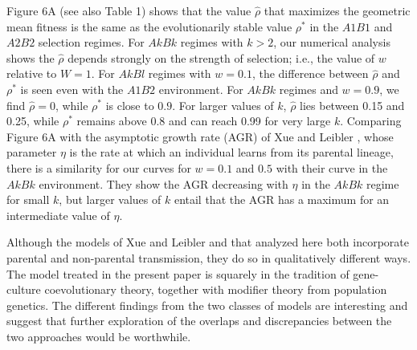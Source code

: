 \documentclass[9pt,twocolumn,twoside,lineno]{pnas-new}
\begin{document}
 Figure 6A (see also Table 1) shows that the value $\hat\rho$ that maximizes the geometric mean fitness is the same as the evolutionarily stable value $\rho^*$ in the $A1B1$ and $A2B2$ selection regimes. For $AkBk$ regimes with $k>2$, our numerical analysis shows the $\hat\rho$ depends strongly on the strength of selection; i.e., the value of $w$ relative to $W=1$. For $AkBl$ regimes with $w=0.1$, the difference between $\hat\rho$ and $\rho^*$ is seen even with the $A1B2$ environment. For $AkBk$ regimes and $w=0.9$, we find $\hat\rho=0$, while $\rho^*$ is close to $0.9$. For larger values of $k$, $\hat\rho$ lies between 0.15 and 0.25, while $\rho^*$ remains above 0.8 and can reach 0.99 for very large $k$. Comparing Figure 6A with the asymptotic growth rate (AGR) of Xue and Leibler \cite{xue2016evolutionary}, whose parameter $\eta$ is the rate at which an individual learns from its parental lineage, there is a similarity for our curves for $w=0.1$ and $0.5$ with their curve in the $AkBk$ environment. They show the AGR decreasing with $\eta$ in the $AkBk$ regime for small $k$, but larger values of $k$ entail that the AGR has a maximum for an intermediate value of $\eta$.
 
 Although the models of Xue and Leibler \cite{xue2016evolutionary} and that analyzed here both incorporate parental and non-parental transmission, they do so in qualitatively different ways. The model treated in the present paper is squarely in the tradition of gene-culture coevolutionary theory, together with modifier theory from population genetics. The different findings from the two classes of models are interesting and suggest that further exploration of the overlaps and discrepancies between the two approaches would be worthwhile.
 





 


\end{document}
